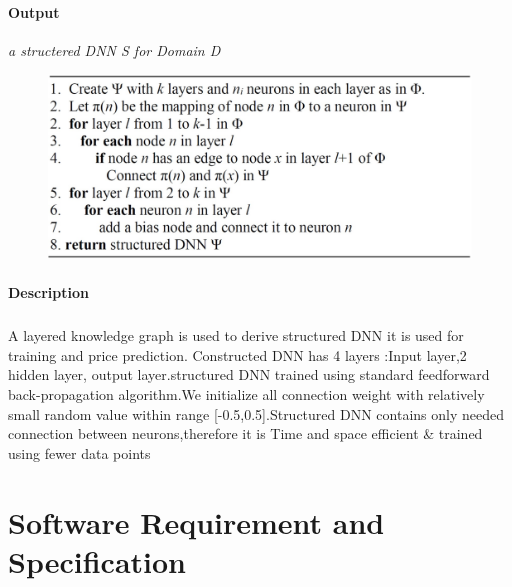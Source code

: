 \documentclass[11pt,fleqn]{book} %
\begin{document}
\subsubsection{Output}
\emph{a structered DNN S for Domain D}
\begin{figure}[h]
    \centering
    \includegraphics[scale=0.5]{Pictures/algo2.jpg}
\end{figure}
\subsubsection{Description}
\paragraph*{}
A layered knowledge graph is used to derive structured DNN it is used  for training and price prediction. Constructed DNN has 4 layers :Input layer,2 hidden layer, output layer.structured DNN trained using standard feedforward back-propagation algorithm.We initialize all connection weight with relatively small random value within range [-0.5,0.5].Structured DNN contains only needed connection between neurons,therefore it is Time and space efficient & trained using fewer data points

\chapter{Software Requirement and Specification}

\end{document}
